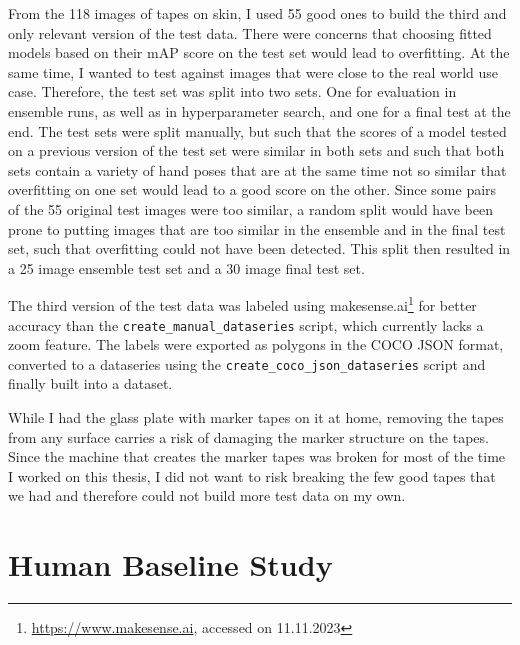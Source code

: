 \documentclass[10pt]{book}
\begin{document}
From the 118 images of tapes on skin, I used 55 good ones to build the third and only relevant version of the test data. There were concerns that choosing fitted models based on their \ac{mAP} score on the test set would lead to overfitting. At the same time, I wanted to test against images that were close to the real world use case. Therefore, the test set was split into two sets. One for evaluation in ensemble runs, as well as in hyperparameter search, and one for a final test at the end. The test sets were split manually, but such that the scores of a model tested on a previous version of the test set were similar in both sets and such that both sets contain a variety of hand poses that are at the same time not so similar that overfitting on one set would lead to a good score on the other. Since some pairs of the 55 original test images were too similar, a random split would have been prone to putting images that are too similar in the ensemble and in the final test set, such that overfitting could not have been detected. This split then resulted in a 25 image ensemble test set and a 30 image final test set.

The third version of the test data was labeled using makesense.ai\footnote{\url{https://www.makesense.ai}, accessed on 11.11.2023} for better accuracy than the \texttt{create\_manual\_dataseries} script, which currently lacks a zoom feature. The labels were exported as polygons in the \ac{COCO} \ac{JSON} format, converted to a dataseries using the \texttt{create\_coco\_json\_dataseries} script and finally built into a dataset.

While I had the glass plate with marker tapes on it at home, removing the tapes from any surface carries a risk of damaging the marker structure on the tapes. Since the machine that creates the marker tapes was broken for most of the time I worked on this thesis, I did not want to risk breaking the few good tapes that we had and therefore could not build more test data on my own.

\section{Human Baseline Study}
\end{document}
